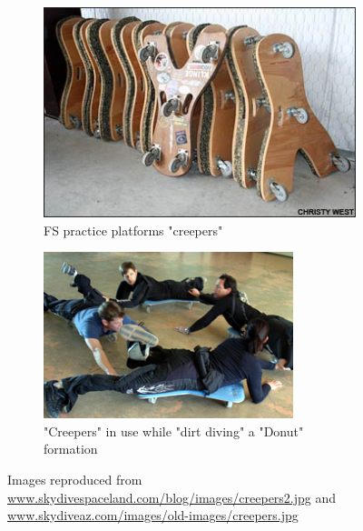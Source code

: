 \documentclass[a4paper, 12pt]{article}
\begin{document}
\begin{figure}[H]
	\centering
	\begin{subfigure}{.5\textwidth}
		\centering
		\includegraphics[width=0.9\linewidth]{creepers.jpg}
		\caption{FS practice platforms "creepers"}
		\label{fig:creepers}
	\end{subfigure}%
	\begin{subfigure}{.5\textwidth}
		\centering
		\includegraphics[width=0.9\linewidth]{creepers_use.jpg}
		\caption{"Creepers" in use while "dirt diving" a "Donut" formation}
		\label{fig:creepers_use}
	\end{subfigure}
	\caption{Images reproduced from \url{www.skydivespaceland.com/blog/images/creepers2.jpg} and \url{www.skydiveaz.com/images/old-images/creepers.jpg}}
\end{figure}
%
\end{document}
